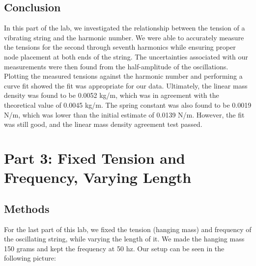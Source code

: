 \documentclass[11pt]{article}
\let\oldsection\section
\renewcommand\section{\clearpage\oldsection}
\begin{document}
    \subsection{Conclusion}\label{subsec:part_2_conclusion}

    In this part of the lab, we investigated the relationship between the tension of a vibrating string and the harmonic number.
    We were able to accurately measure the tensions for the second through seventh harmonics while ensuring proper node placement at both ends of the string.
    The uncertainties associated with our measurements were then found from the half-amplitude of the oscillations.
    Plotting the measured tensions against the harmonic number and performing a curve fit showed the fit was appropriate for our data.
    Ultimately, the linear mass density was found to be 0.0052  kg/m, which was in agreement with the theoretical value of 0.0045  kg/m.
    The spring constant was also found to be 0.0019 N/m, which was lower than the initial estimate of 0.0139 N/m.
    However, the fit was still good, and the linear mass density agreement test passed.


    \section{Part 3: Fixed Tension and Frequency, Varying Length}\label{sec:part_3}

    \subsection{Methods}\label{subsec:part_3_methods}
    For the last part of this lab, we fixed the tension (hanging mass) and frequency of the oscillating string, while varying the length of it. We made the hanging mass 150 grams and kept the frequency at 50 hz. Our setup can be seen in the following picture:
\end{document}
